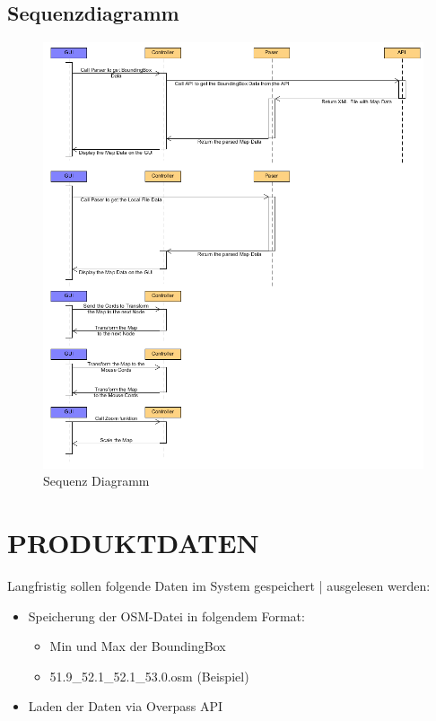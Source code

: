 	\subsection{Sequenzdiagramm}
	\begin{figure}[H]
	\centering
	\includegraphics[width=0.7\linewidth]{images/Squenz}
	\caption{Sequenz Diagramm}
	\label{fig:Sequenz Diagramm}
	\end{figure}
	
\newpage
	\section{\Large PRODUKTDATEN}
		Langfristig sollen folgende Daten im System gespeichert | ausgelesen werden:
	\begin{itemize}
		\item Speicherung der OSM-Datei in folgendem Format: 
		\begin{itemize}
			\item Min und Max der BoundingBox
			\item 51.9\_52.1\_52.1\_53.0.osm (Beispiel)
		\end{itemize}
		\item Laden der Daten via Overpass API
	\end{itemize}
